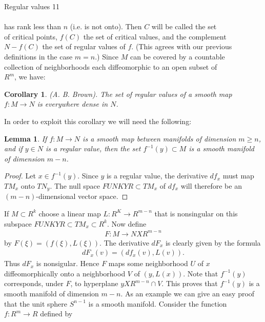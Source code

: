 \documentclass[12pt, openany, closeany]{book}
\newtheorem{lemma}{Lemma}
\theoremstyle{corollary}
\newtheorem*{corollary}{Corollary}
\begin{document}
  \newpage
  Regular values \hfill 11 \\ \\
  has rank less than $n$ (i.e. is not onto). Then $C$ will be called the set \\
  of critical points, $f(C)$ the set of critical values, and the complement \\
  $N - f(C)$ the set of regular values of $f$. (This agrees with our previous \\
  definitions in the case $m = n$.) Since $M$ can be covered by a countable \\
  collection of neighborhoods each diffeomorphic to an open subset of \\
  $R^m$, we have:
  \begin{corollary}
  (A. B. Brown). The set of regular values of a smooth map $f: M\to N$ is everywhere dense in $N$.
  \end{corollary}
  In order to exploit this corollary we will need the following:
  \begin{lemma}
  If $f: M \to N$ is a smooth map between manifolds of dimension $m\geq n$, and if $y\in N$ is a regular value, then the set $f^{-1}(y) \subset M$ is a smooth manifold of dimension $m - n$.
  \end{lemma}
  \begin{proof} Let $x\in f^{-1}(y)$. Since $y$ is a regular value, the derivative $df_{x}$ must map $TM_{x}$ onto $TN_{y}$. The null space $FUNKYR\subset TM_{x}$ of $df_{x}$ will therefore be an $(m - n)$-dimensional vector space.
  \end{proof} 
    If $M \subset R^{k}$ choose a linear map $L : R^K \to R^{m-n}$ that is nonsingular on this subspace $FUNKYR \subset TM_{x} \subset R^k$. Now define
    \begin{align*}
    F : M \to N X R^{m-n}
    \end{align*}
    by $F(\xi) = (f(\xi), L(\xi))$. The derivative $dF_{x}$ is clearly given by the formula
    \begin{align*}
      dF_{x}(v) = (df_{x}(v), L(v)).
    \end{align*}
    Thus $dF_{x}$ is nonsigular. Hence $F$ maps some neighborhood $U$ of $x$ diffeomorphically onto a neighborhood $V$ of $(y, L(x))$. Note that $f^{-1}(y)$ corresponds, under $F$, to hyperplane $y X R^{m-n}\cap V$. This proves that $f^{-1}(y)$ is a smooth manifold of dimension $m - n$. 
    As an example we can give an easy proof that the unit sphere $S^{n-1}$ is a smooth manifold. Consider the function $f : R^m \to R$ defined by
\end{document}
